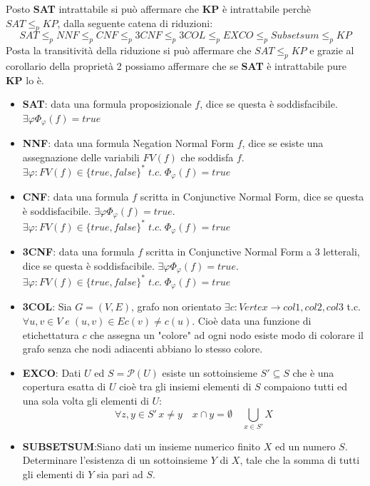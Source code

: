\documentclass[a4paper]{article}
\newcommand{\red}{\leq_p}
\begin{document}
Posto \textbf{SAT} intrattabile si può affermare che \textbf{KP} è intrattabile perchè $SAT \red KP$, dalla seguente catena di riduzioni:
$$ SAT \red NNF \red CNF \red 3CNF \red 3COL \red EXCO \red Subsetsum \red KP$$
Posta la transitività della riduzione si può affermare che $SAT \red KP$ e grazie al corollario della proprietà 2 possiamo affermare che se \textbf{SAT} è intrattabile pure \textbf{KP} lo è.
\begin{itemize}
	\item \textbf{SAT}: data una formula proposizionale $f$, dice se questa è soddisfacibile. $\exists \varphi \Phi _ {\varphi}(f) = true $
	\item \textbf{NNF}: data una formula Negation Normal Form $f$, dice se esiste una assegnazione delle variabili $FV(f)$ che soddisfa $f$.\\$\exists \varphi:FV(f) \in \{true,false\}^* \; t.c. \; \Phi _ {\varphi}(f) = true $
	\item \textbf{CNF}: data una formula $f$ scritta in Conjunctive Normal Form, dice se questa è soddisfacibile. $\exists \varphi \Phi _ {\varphi}(f) = true $.\\
$\exists \varphi:FV(f) \in \{true,false\}^* \; t.c. \; \Phi _ {\varphi}(f) = true $
	\item \textbf{3CNF}: data una formula $f$ scritta in Conjunctive Normal Form a 3 letterali, dice se questa è soddisfacibile. $\exists \varphi \Phi _ {\varphi}(f) = true $.\\
$\exists \varphi:FV(f) \in \{true,false\}^* \; t.c. \; \Phi _ {\varphi}(f) = true $
	\item \textbf{3COL}: Sia $G = (V,E)$, grafo non orientato $\exists c : Vertex \rightarrow {col1,col2,col3}$ t.c. $\forall u,v \in V \; e \; (u,v) \in E c(v) \neq c(u)$.
		Cioè data una funzione di etichettatura $c$ che assegna un "colore" ad ogni nodo esiste modo di colorare il grafo senza che nodi adiacenti abbiano lo stesso colore.
	\item \textbf{EXCO}: Dati $U$ ed $S=\mathcal{P}(U)$ esiste un sottoinsieme $S' \subseteq S$ che è una copertura esatta di $U$ cioè tra gli insiemi elementi di $S$ compaiono tutti ed una sola volta gli elementi di $U$:
		$$\forall z,y \in S'\, x \neq y \quad x \cap y = \emptyset \quad \bigcup_{x \in S'}X $$
	\item \textbf{SUBSETSUM}:Siano dati un insieme numerico finito $X$ ed un numero $S$. Determinare l’esistenza di un sottoinsieme $Y$ di $X$, tale che la somma di tutti gli elementi di $Y$ sia pari ad $S$. 
\end{itemize}
\end{document}
